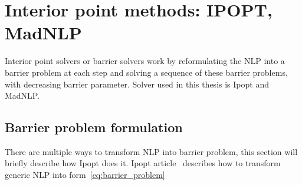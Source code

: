 
\section{Interior point methods: IPOPT, MadNLP}
\label{sec:interior_point}

Interior point solvers or barrier solvers work by reformulating the NLP into a
barrier problem at each step and solving a sequence of these barrier problems, with decreasing
barrier parameter. Solver used in this thesis is Ipopt \cite{wachter_implementation_2006} and MadNLP\cite{shin2024accelerating}.

\subsection{Barrier problem formulation}
\label{subsec:barrier_problem_formulation}
There are multiple ways to transform NLP into barrier problem, this section
will briefly describe how Ipopt does it.
Ipopt article~\cite{wachter_implementation_2006} describes how to transform generic
NLP into form~\ref{eq:barrier_problem} 

